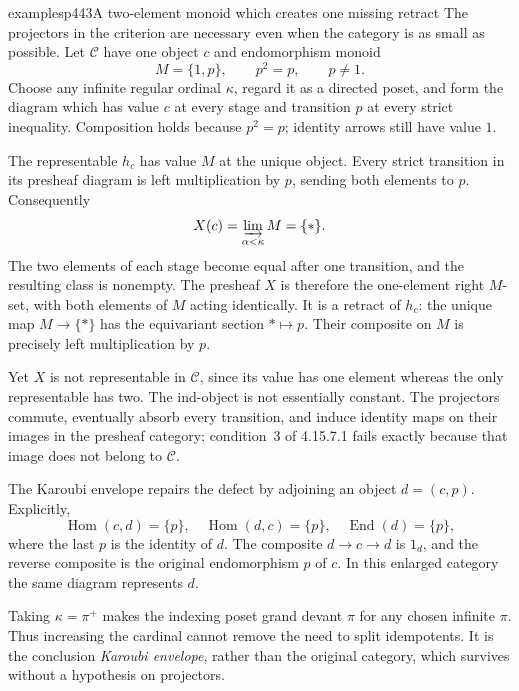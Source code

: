 \begin{dcomment}{examples}{p443}{A two-element monoid which creates one missing retract}
The projectors in the criterion are necessary even when the category is as small as possible. Let $\mathcal C$ have one object $c$ and endomorphism monoid
\[
M=\{1,p\},\qquad p^2=p,\qquad p\ne1.
\]
Choose any infinite regular ordinal $\kappa$, regard it as a directed poset, and form the diagram which has value $c$ at every stage and transition $p$ at every strict inequality. Composition holds because $p^2=p$; identity arrows still have value $1$.

The representable $h_c$ has value $M$ at the unique object. Every strict transition in its presheaf diagram is left multiplication by $p$, sending both elements to $p$. Consequently
\[
X(c)=\varinjlim_{\alpha<\kappa}M=\{*\}.
\]
The two elements of each stage become equal after one transition, and the resulting class is nonempty. The presheaf $X$ is therefore the one-element right $M$-set, with both elements of $M$ acting identically. It is a retract of $h_c$: the unique map $M\to\{*\}$ has the equivariant section $*\mapsto p$. Their composite on $M$ is precisely left multiplication by $p$.

Yet $X$ is not representable in $\mathcal C$, since its value has one element whereas the only representable has two. The ind-object is not essentially constant. The projectors commute, eventually absorb every transition, and induce identity maps on their images in the presheaf category; condition~3 of 4.15.7.1 fails exactly because that image does not belong to $\mathcal C$.

The Karoubi envelope repairs the defect by adjoining an object $d=(c,p)$. Explicitly,
\[
\operatorname{Hom}(c,d)=\{p\},\quad
\operatorname{Hom}(d,c)=\{p\},\quad
\operatorname{End}(d)=\{p\},
\]
where the last $p$ is the identity of $d$. The composite $d\to c\to d$ is $1_d$, and the reverse composite is the original endomorphism $p$ of $c$. In this enlarged category the same diagram represents $d$.

Taking $\kappa=\pi^+$ makes the indexing poset grand devant $\pi$ for any chosen infinite $\pi$. Thus increasing the cardinal cannot remove the need to split idempotents. It is the conclusion \emph{Karoubi envelope}, rather than the original category, which survives without a hypothesis on projectors.
\end{dcomment}

